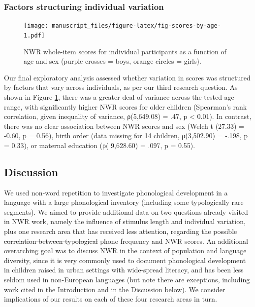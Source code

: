 \documentclass[english,,man,floatsintext]{apa6} %
\providecommand{\DIFaddtex}[1]{{\protect\color{blue}\uwave{#1}}} %
\providecommand{\DIFdeltex}[1]{{\protect\color{red}\sout{#1}}}                      %
\providecommand{\DIFaddbegin}{} %
\providecommand{\DIFaddend}{} %
\providecommand{\DIFdelbegin}{} %
\providecommand{\DIFdelend}{} %
\providecommand{\DIFadd}[1]{\texorpdfstring{\DIFaddtex{#1}}{#1}} %
\providecommand{\DIFdel}[1]{\texorpdfstring{\DIFdeltex{#1}}{}} %
\newcommand{\DIFscaledelfig}{0.5}
\newlength{\DIFdelgraphicswidth} %
\newlength{\DIFdelgraphicsheight} %
\newcommand{\DIFaddincludegraphics}[2][]{{\color{blue}\fbox{\DIFOincludegraphics[#1]{#2}}}} %
\newcommand{\DIFdelincludegraphics}[2][]{%
	\sbox{\DIFdelgraphicsbox}{\DIFOincludegraphics[#1]{#2}}%
	\settoboxwidth{\DIFdelgraphicswidth}{\DIFdelgraphicsbox} %
	\settoboxtotalheight{\DIFdelgraphicsheight}{\DIFdelgraphicsbox} %
	\scalebox{\DIFscaledelfig}{%
		\parbox[b]{\DIFdelgraphicswidth}{\usebox{\DIFdelgraphicsbox}\\[-\baselineskip] \rule{\DIFdelgraphicswidth}{0em}}\llap{\resizebox{\DIFdelgraphicswidth}{\DIFdelgraphicsheight}{%
				\setlength{\unitlength}{\DIFdelgraphicswidth}%
				\begin{picture}(1,1)%
				\thicklines\linethickness{2pt} %
				{\color[rgb]{1,0,0}\put(0,0){\framebox(1,1){}}}%
				{\color[rgb]{1,0,0}\put(0,0){\line( 1,1){1}}}%
				{\color[rgb]{1,0,0}\put(0,1){\line(1,-1){1}}}%
				\end{picture}%
			}\hspace*{3pt}}} %
} %
\DeclareRobustCommand{\DIFaddbegin}{\DIFOaddbegin \let\includegraphics\DIFaddincludegraphics} %
\DeclareRobustCommand{\DIFaddend}{\DIFOaddend \let\includegraphics\DIFOincludegraphics} %
\DeclareRobustCommand{\DIFdelbegin}{\DIFOdelbegin \let\includegraphics\DIFdelincludegraphics} %
\DeclareRobustCommand{\DIFdelend}{\DIFOaddend \let\includegraphics\DIFOincludegraphics} %
\begin{document}
\DIFdelbegin %
\DIFdelend \DIFaddbegin \hypertarget{factors-structuring-individual-variation}{%
	\subsubsection{Factors structuring individual variation}\label{factors-structuring-individual-variation}}
\DIFaddend 

\begin{figure}
	\centering
	\texttt{[image: manuscript\_files/figure-latex/fig-scores-by-age-1.pdf]}
	\caption{\label{fig:fig-scores-by-age}NWR whole-item scores for individual participants as a function of age and sex (purple crosses = boys, orange circles = girls).}
\end{figure}

Our final exploratory analysis assessed whether variation in scores was structured by factors that vary across individuals, as per our third research question. As shown in Figure \ref{fig:fig-scores-by-age}, there was a greater deal of variance across the tested age range, with significantly higher NWR scores for older children (Spearman's rank correlation, given inequality of variance, ρ(5,649.08) = .47, p \textless{} 0.01). In contrast, there was no clear association between NWR scores and sex (Welch t (27.33) = -0.60, p = 0.56), birth order (data missing for 14 children, ρ(3,502.90) = -.198, p = 0.33), or maternal education (ρ( 9,628.60) = .097, p = 0.55).

\hypertarget{discussion}{%
	\subsection{Discussion}\label{discussion}}

We used non-word repetition to investigate phonological development in a language with a large phonological inventory (including some typologically rare segments). We aimed to provide additional data on two questions already visited in NWR work, namely the influence of stimulus length and individual variation, plus one research area that has received less attention, regarding the possible \DIFdelbegin \DIFdel{correlation between typological }\DIFdelend \DIFaddbegin \DIFadd{relationship between }\DIFaddend phone frequency and NWR scores. An additional overarching goal was to discuss NWR in the context of population and language diversity, since it is very commonly used to document phonological development in children raised in urban settings with wide-spread literacy, and has been less seldom used in non-European languages (but note there are exceptions, including work cited in the Introduction and in the Discussion below). We consider implications of our results on each of these four research areas in turn.
\end{document}

